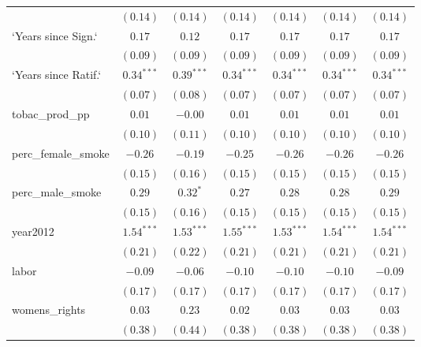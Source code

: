\begin{table}[!h]
\begin{center}
\begin{tabular}{l c c c c c c }
                        & $(0.14)$     & $(0.14)$     & $(0.14)$     & $(0.14)$     & $(0.14)$     & $(0.14)$     \\
`Years since Sign.`     & $0.17$       & $0.12$       & $0.17$       & $0.17$       & $0.17$       & $0.17$       \\
                        & $(0.09)$     & $(0.09)$     & $(0.09)$     & $(0.09)$     & $(0.09)$     & $(0.09)$     \\
`Years since Ratif.`    & $0.34^{***}$ & $0.39^{***}$ & $0.34^{***}$ & $0.34^{***}$ & $0.34^{***}$ & $0.34^{***}$ \\
                        & $(0.07)$     & $(0.08)$     & $(0.07)$     & $(0.07)$     & $(0.07)$     & $(0.07)$     \\
tobac\_prod\_pp         & $0.01$       & $-0.00$      & $0.01$       & $0.01$       & $0.01$       & $0.01$       \\
                        & $(0.10)$     & $(0.11)$     & $(0.10)$     & $(0.10)$     & $(0.10)$     & $(0.10)$     \\
perc\_female\_smoke     & $-0.26$      & $-0.19$      & $-0.25$      & $-0.26$      & $-0.26$      & $-0.26$      \\
                        & $(0.15)$     & $(0.16)$     & $(0.15)$     & $(0.15)$     & $(0.15)$     & $(0.15)$     \\
perc\_male\_smoke       & $0.29$       & $0.32^{*}$   & $0.27$       & $0.28$       & $0.28$       & $0.29$       \\
                        & $(0.15)$     & $(0.16)$     & $(0.15)$     & $(0.15)$     & $(0.15)$     & $(0.15)$     \\
year2012                & $1.54^{***}$ & $1.53^{***}$ & $1.55^{***}$ & $1.53^{***}$ & $1.54^{***}$ & $1.54^{***}$ \\
                        & $(0.21)$     & $(0.22)$     & $(0.21)$     & $(0.21)$     & $(0.21)$     & $(0.21)$     \\
labor                   & $-0.09$      & $-0.06$      & $-0.10$      & $-0.10$      & $-0.10$      & $-0.09$      \\
                        & $(0.17)$     & $(0.17)$     & $(0.17)$     & $(0.17)$     & $(0.17)$     & $(0.17)$     \\
womens\_rights          & $0.03$       & $0.23$       & $0.02$       & $0.03$       & $0.03$       & $0.03$       \\
                        & $(0.38)$     & $(0.44)$     & $(0.38)$     & $(0.38)$     & $(0.38)$     & $(0.38)$     \\

\end{tabular}
\end{center}
\end{table}
